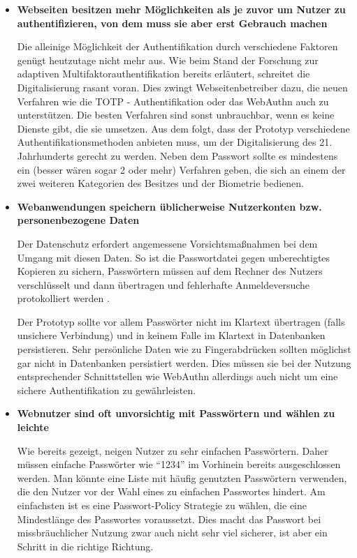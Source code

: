 \begin{itemize}
\item \textbf{Webseiten besitzen mehr Möglichkeiten als je zuvor um Nutzer zu authentifizieren, von dem muss sie aber erst Gebrauch machen}

Die alleinige Möglichkeit der Authentifikation durch verschiedene Faktoren genügt heutzutage nicht mehr aus. Wie beim Stand der Forschung zur adaptiven Multifaktorauthentifikation bereits erläutert, schreitet die Digitalisierung rasant voran. Dies zwingt Webseitenbetreiber dazu, die neuen Verfahren wie die TOTP - Authentifikation oder das WebAuthn auch zu unterstützen. Die besten Verfahren sind sonst unbrauchbar, wenn es keine Dienste gibt, die sie umsetzen. Aus dem folgt, dass der Prototyp verschiedene Authentifikationsmethoden anbieten muss, um der Digitalisierung des 21. Jahrhunderts gerecht zu werden. Neben dem Passwort sollte es mindestens ein (besser wären sogar 2 oder mehr) Verfahren geben, die sich an einem der zwei weiteren Kategorien des Besitzes und der Biometrie bedienen.

\item \textbf{Webanwendungen speichern üblicherweise Nutzerkonten bzw. personenbezogene Daten}

Der Datenschutz erfordert angemessene Vorsichtsmaßnahmen bei dem Umgang mit diesen Daten. So ist die Passwortdatei gegen unberechtigtes Kopieren zu sichern, Passwörtern müssen auf dem Rechner des Nutzers verschlüsselt und dann übertragen und fehlerhafte Anmeldeversuche protokolliert werden \cite{A32}.

Der Prototyp sollte vor allem Passwörter nicht im Klartext übertragen (falls unsichere Verbindung) und in keinem Falle im Klartext in Datenbanken persistieren. Sehr persönliche Daten wie zu Fingerabdrücken sollten möglichst gar nicht in Datenbanken persistiert werden. Dies müssen sie bei der Nutzung entsprechender Schnittstellen wie WebAuthn allerdings auch nicht um eine sichere Authentifikation zu gewährleisten.

\item \textbf{Webnutzer sind oft unvorsichtig mit Passwörtern und wählen zu leichte}

Wie bereits gezeigt, neigen Nutzer zu sehr einfachen Passwörtern. Daher müssen einfache Passwörter wie ``1234'' im Vorhinein bereits ausgeschlossen werden. Man könnte eine Liste mit häufig genutzten Passwörtern verwenden, die den Nutzer vor der Wahl eines zu einfachen Passwortes hindert. Am einfachsten ist es eine Passwort-Policy Strategie zu wählen, die eine Mindestlänge des Passwortes voraussetzt. Dies macht das Passwort bei missbräuchlicher Nutzung zwar auch nicht sehr viel sicherer, ist aber ein Schritt in die richtige Richtung.

\end{itemize}
\newpage


